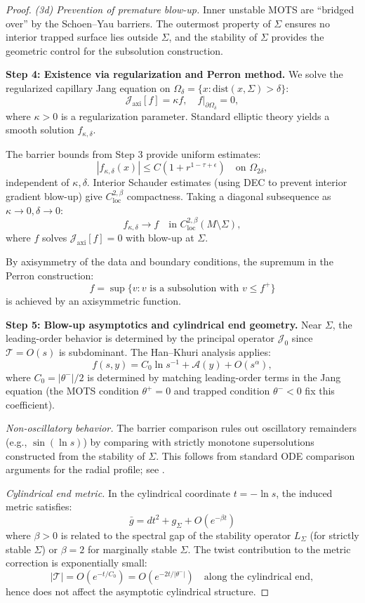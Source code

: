 \documentclass[12pt]{article}
\theoremstyle{plain}
\theoremstyle{definition}
\theoremstyle{remark}
\newcommand{\bg}{\bar{g}}
\begin{document}
\begin{proof}
\textit{(3d) Prevention of premature blow-up.} Inner unstable MOTS are ``bridged over'' by the Schoen--Yau barriers. The outermost property of $\Sigma$ ensures no interior trapped surface lies outside $\Sigma$, and the stability of $\Sigma$ provides the geometric control for the subsolution construction.

\textbf{Step 4: Existence via regularization and Perron method.}
We solve the regularized capillary Jang equation on $\Omega_\delta = \{x : \mathrm{dist}(x, \Sigma) > \delta\}$:
\[
\mathcal{J}_{\text{axi}}[f] = \kappa f, \quad f|_{\partial\Omega_\delta} = 0,
\]
where $\kappa > 0$ is a regularization parameter. Standard elliptic theory \cite{gilbargtrudinger2001} yields a smooth solution $f_{\kappa,\delta}$.

The barrier bounds from Step 3 provide uniform estimates:
\[
|f_{\kappa,\delta}(x)| \leq C(1 + r^{1-\tau+\epsilon}) \quad \text{on } \Omega_{2\delta},
\]
independent of $\kappa, \delta$. Interior Schauder estimates (using DEC to prevent interior gradient blow-up) give $C^{2,\beta}_{\text{loc}}$ compactness. Taking a diagonal subsequence as $\kappa \to 0, \delta \to 0$:
\[
f_{\kappa,\delta} \to f \quad \text{in } C^{2,\beta}_{\text{loc}}(M \setminus \Sigma),
\]
where $f$ solves $\mathcal{J}_{\text{axi}}[f] = 0$ with blow-up at $\Sigma$.

By axisymmetry of the data and boundary conditions, the supremum in the Perron construction:
\[
f = \sup\{v : v \text{ is a subsolution with } v \leq f^+\}
\]
is achieved by an axisymmetric function.

\textbf{Step 5: Blow-up asymptotics and cylindrical end geometry.}
Near $\Sigma$, the leading-order behavior is determined by the principal operator $\mathcal{J}_0$ since $\mathcal{T} = O(s)$ is subdominant. The Han--Khuri analysis \cite[Proposition 4.5]{hankhuri2013} applies:
\[
f(s, y) = C_0 \ln s^{-1} + \mathcal{A}(y) + O(s^\alpha),
\]
where $C_0 = |\theta^-|/2$ is determined by matching leading-order terms in the Jang equation (the MOTS condition $\theta^+ = 0$ and trapped condition $\theta^- < 0$ fix this coefficient).

\textit{Non-oscillatory behavior.} The barrier comparison rules out oscillatory remainders (e.g., $\sin(\ln s)$) by comparing with strictly monotone supersolutions constructed from the stability of $\Sigma$. This follows from standard ODE comparison arguments for the radial profile; see \cite[Section 5]{hankhuri2013}.

\textit{Cylindrical end metric.} In the cylindrical coordinate $t = -\ln s$, the induced metric satisfies:
\[
\bg = dt^2 + g_\Sigma + O(e^{-\beta t})
\]
where $\beta > 0$ is related to the spectral gap of the stability operator $L_\Sigma$ (for strictly stable $\Sigma$) or $\beta = 2$ for marginally stable $\Sigma$. The twist contribution to the metric correction is exponentially small:
\[
|\mathcal{T}| = O(e^{-t/C_0}) = O(e^{-2t/|\theta^-|}) \quad \text{along the cylindrical end},
\]
hence does not affect the asymptotic cylindrical structure.


\end{proof}
\end{document}
